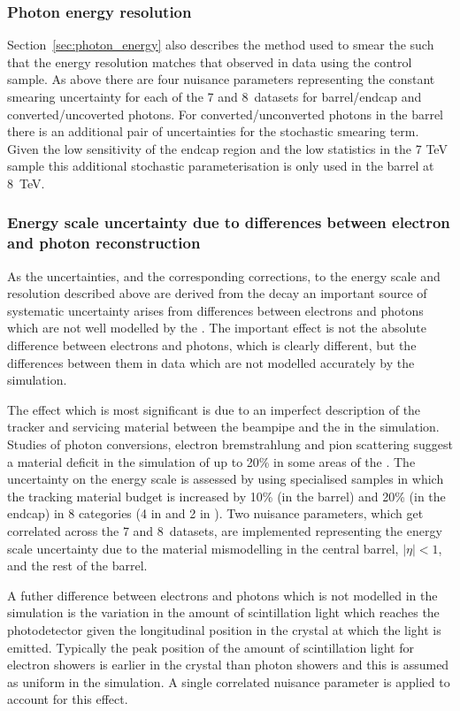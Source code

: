 \subsubsection{Photon energy resolution}
Section~\ref{sec:photon_energy} also describes the method used to smear the \MC such that the energy resolution matches that observed in data using the \Zee control sample. As above there are four nuisance parameters representing the constant smearing uncertainty for each of the 7 and 8~\TeV datasets for barrel/endcap and converted/uncoverted photons. For converted/unconverted photons in the barrel there is an additional pair of uncertainties for the stochastic smearing term. Given the low sensitivity of the endcap region and the low statistics in the 7 TeV sample this additional stochastic parameterisation is only used in the barrel at 8~TeV.

\subsubsection{Energy scale uncertainty due to differences between electron and photon reconstruction}
As the uncertainties, and the corresponding corrections, to the energy scale and resolution described above are derived from the \Zee decay an important source of systematic uncertainty arises from differences between electrons and photons which are not well modelled by the \MC. The important effect is not the absolute difference between electrons and photons, which is clearly different, but the differences between them in data which are not modelled accurately by the simulation. 

The effect which is most significant is due to an imperfect description of the tracker and servicing material between the beampipe and the \ECAL in the simulation. Studies of photon conversions, electron bremstrahlung and pion scattering suggest a material deficit in the simulation of up to 20\% in some areas of the \ECAL. The uncertainty on the energy scale is assessed by using specialised \MC samples in which the tracking material budget is increased by 10\% (in the barrel) and 20\% (in the endcap) in 8 categories (4 in \eta and 2 in \rnine). Two nuisance parameters, which get correlated across the 7 and 8~\TeV datasets, are implemented representing the energy scale uncertainty due to the material mismodelling in the central barrel, $|\eta|<1$, and the rest of the barrel.

A futher difference between electrons and photons which is not modelled in the simulation is the variation in the amount of scintillation light which reaches the photodetector given the longitudinal position in the crystal at which the light is emitted. Typically the peak position of the amount of scintillation light for electron showers is earlier in the crystal than photon showers and this is assumed as uniform in the simulation. A single correlated nuisance parameter is applied to account for this effect.

